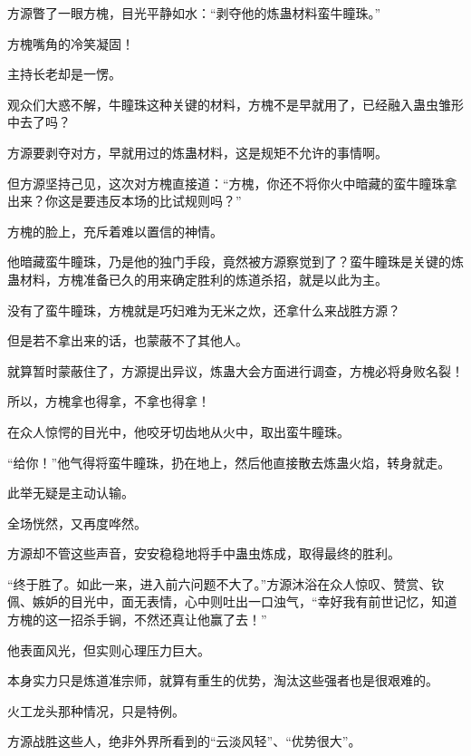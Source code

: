 \begin{this_body}
方源瞥了一眼方槐，目光平静如水：“剥夺他的炼蛊材料蛮牛瞳珠。”

方槐嘴角的冷笑凝固！

主持长老却是一愣。

观众们大惑不解，牛瞳珠这种关键的材料，方槐不是早就用了，已经融入蛊虫雏形中去了吗？

方源要剥夺对方，早就用过的炼蛊材料，这是规矩不允许的事情啊。

但方源坚持己见，这次对方槐直接道：“方槐，你还不将你火中暗藏的蛮牛瞳珠拿出来？你这是要违反本场的比试规则吗？”

方槐的脸上，充斥着难以置信的神情。

他暗藏蛮牛瞳珠，乃是他的独门手段，竟然被方源察觉到了？蛮牛瞳珠是关键的炼蛊材料，方槐准备已久的用来确定胜利的炼道杀招，就是以此为主。

没有了蛮牛瞳珠，方槐就是巧妇难为无米之炊，还拿什么来战胜方源？

但是若不拿出来的话，也蒙蔽不了其他人。

就算暂时蒙蔽住了，方源提出异议，炼蛊大会方面进行调查，方槐必将身败名裂！

所以，方槐拿也得拿，不拿也得拿！

在众人惊愕的目光中，他咬牙切齿地从火中，取出蛮牛瞳珠。

“给你！”他气得将蛮牛瞳珠，扔在地上，然后他直接散去炼蛊火焰，转身就走。

此举无疑是主动认输。

全场恍然，又再度哗然。

方源却不管这些声音，安安稳稳地将手中蛊虫炼成，取得最终的胜利。

“终于胜了。如此一来，进入前六问题不大了。”方源沐浴在众人惊叹、赞赏、钦佩、嫉妒的目光中，面无表情，心中则吐出一口浊气，“幸好我有前世记忆，知道方槐的这一招杀手锏，不然还真让他赢了去！”

他表面风光，但实则心理压力巨大。

本身实力只是炼道准宗师，就算有重生的优势，淘汰这些强者也是很艰难的。

火工龙头那种情况，只是特例。

方源战胜这些人，绝非外界所看到的“云淡风轻”、“优势很大”。

\end{this_body}

